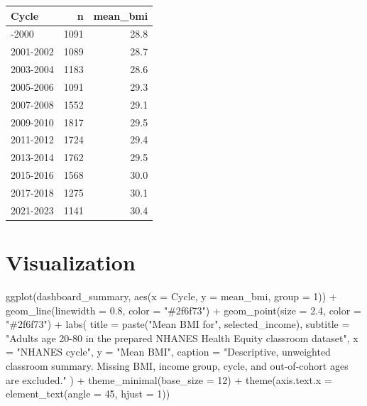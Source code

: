 \documentclass[
  letterpaper,
  DIV=11,
  numbers=noendperiod,
  oneside]{scrreprt}
\newenvironment{Shaded}{\begin{snugshade}}{\end{snugshade}}
\newcommand{\AttributeTok}[1]{\textcolor[rgb]{0.40,0.45,0.13}{#1}}
\newcommand{\DecValTok}[1]{\textcolor[rgb]{0.68,0.00,0.00}{#1}}
\newcommand{\FloatTok}[1]{\textcolor[rgb]{0.68,0.00,0.00}{#1}}
\newcommand{\FunctionTok}[1]{\textcolor[rgb]{0.28,0.35,0.67}{#1}}
\newcommand{\NormalTok}[1]{\textcolor[rgb]{0.00,0.23,0.31}{#1}}
\newcommand{\SpecialCharTok}[1]{\textcolor[rgb]{0.37,0.37,0.37}{#1}}
\newcommand{\StringTok}[1]{\textcolor[rgb]{0.13,0.47,0.30}{#1}}
\begin{document}
\begin{longtable}[]{@{}lrr@{}}
\toprule\noalign{}
Cycle & n & mean\_bmi \\
\midrule\noalign{}
\endhead
\bottomrule\noalign{}
\endlastfoot
1999-2000 & 1091 & 28.8 \\
2001-2002 & 1089 & 28.7 \\
2003-2004 & 1183 & 28.6 \\
2005-2006 & 1091 & 29.3 \\
2007-2008 & 1552 & 29.1 \\
2009-2010 & 1817 & 29.5 \\
2011-2012 & 1724 & 29.4 \\
2013-2014 & 1762 & 29.5 \\
2015-2016 & 1568 & 30.0 \\
2017-2018 & 1275 & 30.1 \\
2021-2023 & 1141 & 30.4 \\
\end{longtable}

\section*{Visualization}\label{visualization-1}


\begin{Shaded}
\begin{Highlighting}[numbers=left,,]
\FunctionTok{ggplot}\NormalTok{(dashboard\_summary, }\FunctionTok{aes}\NormalTok{(}\AttributeTok{x =}\NormalTok{ Cycle, }\AttributeTok{y =}\NormalTok{ mean\_bmi, }\AttributeTok{group =} \DecValTok{1}\NormalTok{)) }\SpecialCharTok{+}
  \FunctionTok{geom\_line}\NormalTok{(}\AttributeTok{linewidth =} \FloatTok{0.8}\NormalTok{, }\AttributeTok{color =} \StringTok{"\#2f6f73"}\NormalTok{) }\SpecialCharTok{+}
  \FunctionTok{geom\_point}\NormalTok{(}\AttributeTok{size =} \FloatTok{2.4}\NormalTok{, }\AttributeTok{color =} \StringTok{"\#2f6f73"}\NormalTok{) }\SpecialCharTok{+}
  \FunctionTok{labs}\NormalTok{(}
    \AttributeTok{title =} \FunctionTok{paste}\NormalTok{(}\StringTok{"Mean BMI for"}\NormalTok{, selected\_income),}
    \AttributeTok{subtitle =} \StringTok{"Adults age 20{-}80 in the prepared NHANES Health Equity classroom dataset"}\NormalTok{,}
    \AttributeTok{x =} \StringTok{"NHANES cycle"}\NormalTok{,}
    \AttributeTok{y =} \StringTok{"Mean BMI"}\NormalTok{,}
    \AttributeTok{caption =} \StringTok{"Descriptive, unweighted classroom summary. Missing BMI, income group, cycle, and out{-}of{-}cohort ages are excluded."}
\NormalTok{  ) }\SpecialCharTok{+}
  \FunctionTok{theme\_minimal}\NormalTok{(}\AttributeTok{base\_size =} \DecValTok{12}\NormalTok{) }\SpecialCharTok{+}
  \FunctionTok{theme}\NormalTok{(}\AttributeTok{axis.text.x =} \FunctionTok{element\_text}\NormalTok{(}\AttributeTok{angle =} \DecValTok{45}\NormalTok{, }\AttributeTok{hjust =} \DecValTok{1}\NormalTok{))}
\end{Highlighting}
\end{Shaded}
\end{document}
